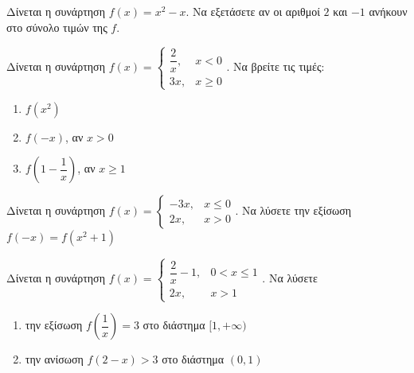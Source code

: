 \documentclass{presentation}
\begin{document}
\begin{askisi}
  Δίνεται η συνάρτηση $f(x)=x^2-x$. Να εξετάσετε αν οι αριθμοί $2$ και $-1$ ανήκουν στο σύνολο τιμών της $f$.
\end{askisi}

\begin{askisi}
  Δίνεται η συνάρτηση $f(x)=\begin{cases}
      \dfrac{2}{x}, & x< 0    \\
      3x,           & x \ge 0
    \end{cases}$. Να βρείτε τις τιμές:
  \begin{enumerate}[<+->]
    \item $f(x^2)$
    \item $f(-x)$, αν $x>0$
    \item $f\left(1-\dfrac{1}{x}\right)$, αν $x\ge 1$
  \end{enumerate}
\end{askisi}

\begin{askisi}
  Δίνεται η συνάρτηση $f(x)=\begin{cases}
      -3x, & x\le 0 \\
      2x,  & x > 0
    \end{cases}$. Να λύσετε την εξίσωση $f(-x)=f(x^2+1)$
\end{askisi}

\begin{askisi}
  Δίνεται η συνάρτηση $f(x)=\begin{cases}
      \dfrac{2}{x}-1, & 0<x\le 1 \\
      2x,             & x > 1
    \end{cases}$. Να λύσετε
  \begin{enumerate}[<+->]
    \item την εξίσωση $f\left(\dfrac{1}{x}\right)=3$ στο διάστημα $[1,+\infty)$
    \item την ανίσωση $f(2-x)>3$ στο διάστημα $(0,1)$
  \end{enumerate}
\end{askisi}
\end{document}

